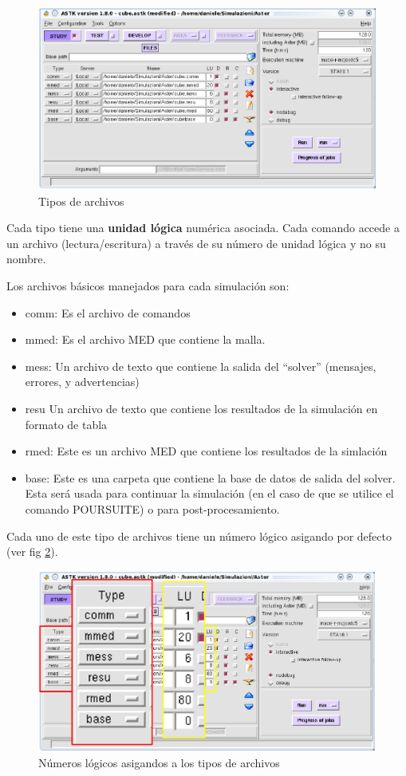 \documentclass[12pt]{book}
\theoremstyle{definition}
\theoremstyle{remark}
\theoremstyle{plain}
\begin{document}
\begin{figure}
\centering
\includegraphics[width=5in]{tipos.png}
\caption{Tipos de archivos}
\label{fig4}
\end{figure}

Cada tipo tiene una \textbf{unidad lógica} numérica asociada. Cada comando accede
a un archivo (lectura/escritura) a través de su número de unidad lógica y no su nombre. 

Los archivos básicos manejados para cada simulación son:
\begin{itemize}
 \item comm: Es el archivo de comandos
 \item mmed: Es el archivo MED que contiene la malla.
 \item mess: Un archivo de texto que contiene la salida del ``solver'' (mensajes, errores,
y advertencias)
 \item resu Un archivo de texto que contiene los resultados de la 
simulación en formato de tabla
 \item rmed: Este es un archivo MED que contiene los resultados de la simlación
 \item base: Este es una carpeta que contiene la base de datos de salida del solver. Esta
será usada para continuar la simulación (en el caso de que se utilice el 
comando POURSUITE) o para post-procesamiento.
\end{itemize}

Cada uno de este tipo de archivos tiene un número lógico asigando por defecto (ver 
fig \ref{fig5}).

\begin{figure}
\centering
\includegraphics[width=5in]{numeroslogicos.png}
\caption{Números lógicos asigandos a los tipos de archivos}
\label{fig5}
\end{figure}
\end{document}
